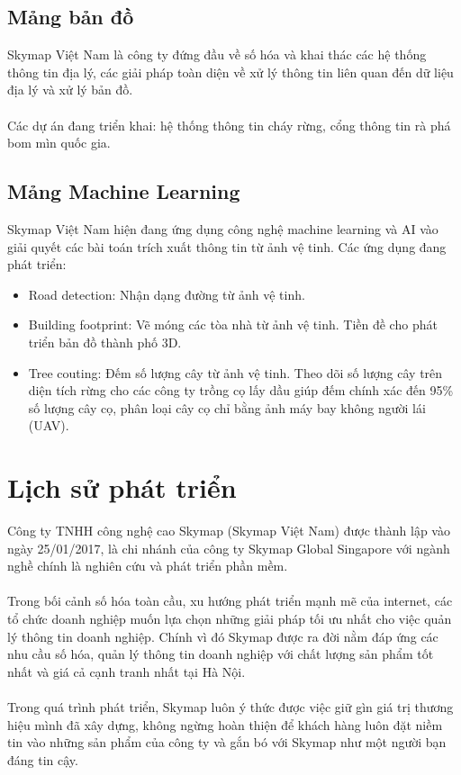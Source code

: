 \documentclass[12pt,a4paper]{report}
\begin{document}
\subsection{Mảng bản đồ}
Skymap Việt Nam là công ty đứng đầu về số hóa và khai thác các hệ thống
thông tin địa lý, các giải pháp toàn diện về xử lý thông tin liên quan đến dữ
liệu địa lý và xử lý bản đồ.\\\\
Các dự án đang triển khai: hệ thống thông tin cháy rừng, cổng thông tin rà phá
bom mìn quốc gia.

\subsection{Mảng Machine Learning}
Skymap Việt Nam hiện đang ứng dụng công nghệ machine learning và AI vào giải quyết các bài toán trích xuất thông tin từ ảnh vệ tinh. Các ứng dụng đang phát triển:
\begin{itemize}
	\item Road detection: Nhận dạng đường từ ảnh vệ tinh.
	\item Building footprint: Vẽ móng các tòa nhà từ ảnh vệ tinh. Tiền đề cho phát triển bản đồ thành phố 3D.
	\item Tree couting: Đếm số lượng cây từ ảnh vệ tinh. Theo dõi số lượng cây trên diện tích rừng cho các công ty trồng cọ lấy dầu giúp đếm chính xác đến 95\% số lượng cây cọ, phân loại cây cọ chỉ bằng ảnh máy bay không người lái (UAV).
\end{itemize}

\section{Lịch sử phát triển}
Công ty TNHH công nghệ cao Skymap (Skymap Việt Nam) được thành lập vào ngày 25/01/2017, là chi nhánh của công ty Skymap Global Singapore với ngành nghề chính là nghiên cứu và phát triển phần mềm. \\\\ Trong bối cảnh số hóa toàn cầu, xu hướng phát triển mạnh mẽ của internet, các tổ chức doanh nghiệp muốn lựa chọn những giải pháp tối ưu nhất cho việc quản lý thông tin doanh nghiệp. Chính vì đó Skymap được ra đời nằm đáp ứng các nhu cầu số hóa, quản lý thông tin doanh nghiệp với chất lượng sản phẩm tốt nhất và giá cả cạnh tranh nhất tại Hà Nội. \\\\ Trong quá trình phát triển, Skymap luôn ý thức được việc giữ gìn giá trị thương hiệu mình đã xây dựng, không ngừng hoàn thiện để khách hàng luôn đặt niềm tin vào những sản phẩm của công ty và gắn bó với Skymap như một người bạn đáng tin cậy.
\end{document}
